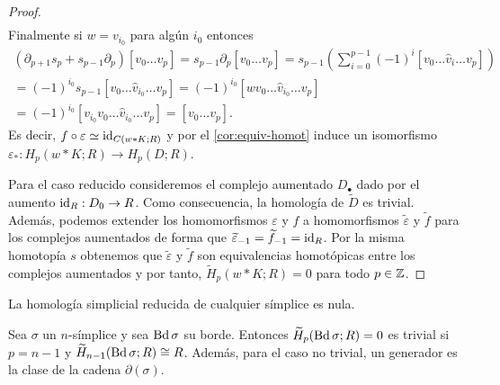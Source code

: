 \begin{proof}
\begin{gather*}
	\end{gather*}
	Finalmente si \(w = v_{i_0}\) para algún \(i_{0}\) entonces
	\begin{gather*}
		(\partial_{p+1}s_{p}+s_{p-1}\partial_{p})[v_{0}\ldots v_{p}]=s_{p-1}\partial_{p}
		[v_{0}\ldots v_{p}] =s_{p-1}\left( \sum_{i=0}^{p-1}(-1)^{i} [v_{0}\ldots \hat{v}
		_{i} \ldots v_{p}] \right) \\ =(-1)^{i_0}s_{p-1}[v_{0}\ldots \hat{v}_{i_0}\ldots
		v_{p}] =(-1)^{i_0}[wv_{0}\ldots \hat{v}_{i_0}\ldots v_{p}] \\ =(-1)^{i_0}[v_{i_0}
		v_{0}\ldots \hat{v}_{i_0}\ldots v_{p}] =[v_{0}\ldots v_{p}].
	\end{gather*}
	Es decir, \(f \circ \varepsilon \simeq \operatorname{id}_{C(w \ast K;R)}\) y por el
	\autoref{cor:equiv-homot} induce un isomorfismo
	\(\varepsilon_{*}: H_{p}(w \ast K;R) \to H_{p}(D;R)\).

	Para el caso reducido consideremos el complejo aumentado \(D_{\bullet}\) dado
	por el aumento \(\operatorname{id}_{R} : D_{0} \to R\). Como consecuencia, la homología de
	\(\widetilde{D}\) es trivial. Además, podemos extender los homomorfismos
	\(\varepsilon\) y \(f\) a homomorfismos \(\widetilde{\varepsilon}\) y
	\(\widetilde{f}\) para los complejos aumentados de forma que
	\(\widetilde{\varepsilon}_{-1}= \widetilde{f}_{-1}= \operatorname{id}_{R}\). Por la misma homotopía
	\(s\) obtenemos que \(\widetilde{\varepsilon}\) y \(\widetilde{f}\) son equivalencias
	homotópicas entre los complejos aumentados y por tanto,
	\(\widetilde{H}_{p}(w \ast K;R) = 0\) para todo \(p \in \mathbb{Z}\).
\end{proof}
\begin{corolario}
	\label{cor:cono-nulo} La homología simplicial reducida de cualquier símplice es
	nula.
\end{corolario}
\begin{corolario}
	Sea \(\sigma\) un \(n\)-símplice y sea \(\operatorname{Bd} \sigma\) su borde. Entonces
	\(\widetilde{H}_{p}(\operatorname{Bd} \sigma;R) = 0\) es trivial si \(p = n-1\) y
	\(\widetilde{H}_{n-1}(\operatorname{Bd} \sigma; R) \cong R\). Además, para el caso no trivial,
	un generador es la clase de la cadena \(\partial(\sigma)\).
\end{corolario}
